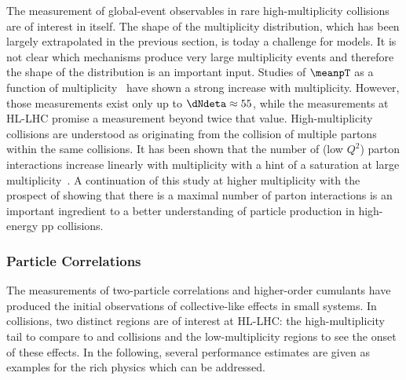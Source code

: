 \documentclass[../report.tex]{subfiles}
\begin{document}
The measurement of global-event observables in rare high-multiplicity \pp collisions are of interest in itself. The shape of the multiplicity distribution, which has been largely extrapolated in the previous section, is today a challenge for models. It is not clear which mechanisms produce very large multiplicity events and therefore the shape of the distribution is an important input. Studies of $\meanpT$ as a function of multiplicity~\cite{Abelev:2013bla} have shown a strong increase with multiplicity. However, those measurements exist only up to $\dNdeta \approx 55$, while the measurements at HL-LHC promise a measurement beyond twice that value. High-multiplicity collisions are understood as originating from the collision of multiple partons within the same \pp collisions. It has been shown that the number of (low $Q^2$) parton interactions increase linearly with multiplicity with a hint of a saturation at large multiplicity~\cite{Abelev:2013sqa}. A continuation of this study at higher multiplicity with the prospect of showing that there is a maximal number of parton interactions is an important ingredient to a better understanding of particle production in high-energy pp collisions.

\subsubsection{Particle Correlations}

The measurements of two-particle correlations and higher-order cumulants have produced the initial observations of collective-like effects in small systems. In \pp collisions, two distinct regions are of interest at HL-LHC: the high-multiplicity tail to compare to \pPb and \PbPb collisions and the low-multiplicity regions to see the onset of these effects. In the following, several performance estimates are given as examples for the rich physics which can be addressed. 
\end{document}
